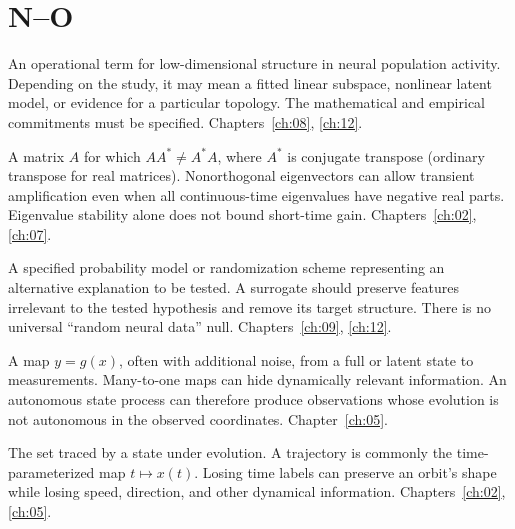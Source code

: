 \section*{N--O}
\begin{description}[style=nextline]
\item[Neural manifold.] An operational term for low-dimensional structure in neural population activity. Depending on the study, it may mean a fitted linear subspace, nonlinear latent model, or evidence for a particular topology. The mathematical and empirical commitments must be specified. Chapters~\ref{ch:08}, \ref{ch:12}.
\item[Non-normal matrix.] A matrix $A$ for which $AA^*\ne A^*A$, where $A^*$ is conjugate transpose (ordinary transpose for real matrices). Nonorthogonal eigenvectors can allow transient amplification even when all continuous-time eigenvalues have negative real parts. Eigenvalue stability alone does not bound short-time gain. Chapters~\ref{ch:02}, \ref{ch:07}.
\item[Null model.] A specified probability model or randomization scheme representing an alternative explanation to be tested. A surrogate should preserve features irrelevant to the tested hypothesis and remove its target structure. There is no universal ``random neural data'' null. Chapters~\ref{ch:09}, \ref{ch:12}.
\item[Observation map.] A map $y=g(x)$, often with additional noise, from a full or latent state to measurements. Many-to-one maps can hide dynamically relevant information. An autonomous state process can therefore produce observations whose evolution is not autonomous in the observed coordinates. Chapter~\ref{ch:05}.
\item[Orbit.] The set traced by a state under evolution. A trajectory is commonly the time-parameterized map $t\mapsto x(t)$. Losing time labels can preserve an orbit's shape while losing speed, direction, and other dynamical information. Chapters~\ref{ch:02}, \ref{ch:05}.
\end{description}

